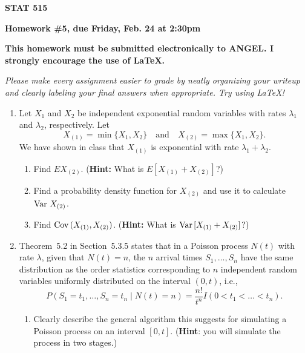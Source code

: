 \documentclass{article}
\def\Var{\mathop{\rm Var\,}\nolimits}
\def\Cov{\mathop{\rm Cov\,}\nolimits}
\begin{document}
\begin{center}
{\bf STAT 515}

{\bf Homework \#5, due Friday, Feb. 24 at 2:30pm}

{\bf This homework must be submitted electronically to ANGEL.  I strongly
encourage the use of \LaTeX.}

\end{center}

{\it Please make every assignment easier to grade by neatly organizing your
writeup and clearly labeling your final answers when appropriate. Try using
\LaTeX!}

\begin{enumerate}

\item Let $X_1$ and $X_2$ be independent exponential random variables with rates
$\lambda_1$ and $\lambda_2$, respectively. Let
\[
X_{(1)} = \min\{ X_1, X_2 \} \quad\mbox{and}\quad X_{(2)} = \max\{X_1, X_2 \}.
\]
We have shown in class that $X_{(1)}$ is exponential with rate
$\lambda_1+\lambda_2$.

  \begin{enumerate}
  
  \item Find $E X_{(2)}$. ({\bf Hint:} What is $E [ X_{(1)} + X_{(2)} ]$?)
  
  \item Find a probability density function for $X_{(2)}$ and use it to
  calculate $\Var X_{(2)}$.
  
  \item Find $\Cov (X_{(1)}, X_{(2)})$. ({\bf Hint:} What is $\Var[ X_{(1)} +
  X_{(2)} ]$?)
  
  \end{enumerate}

\item Theorem~5.2 in Section~5.3.5 states that in a Poisson process $N(t)$ with
rate $\lambda$, given that $N(t)=n$, the $n$ arrival times $S_1,\dots,S_n$ have
the same distribution as the order statistics corresponding to $n$ independent
random variables uniformly distributed on the interval $(0,t)$, i.e.,
$$P(S_1=t_1,\dots,S_n=t_n \mid N(t)=n)=\frac{n!}{t^n} I(0<t_1<\dots <t_n). $$

  \begin{enumerate}

  \item Clearly describe the general algorithm this suggests for simulating a
  Poisson process on an interval $[0,t]$. ({\bf Hint}: you will simulate the
  process in two stages.)


\end{enumerate}
\end{enumerate}
\end{document}
